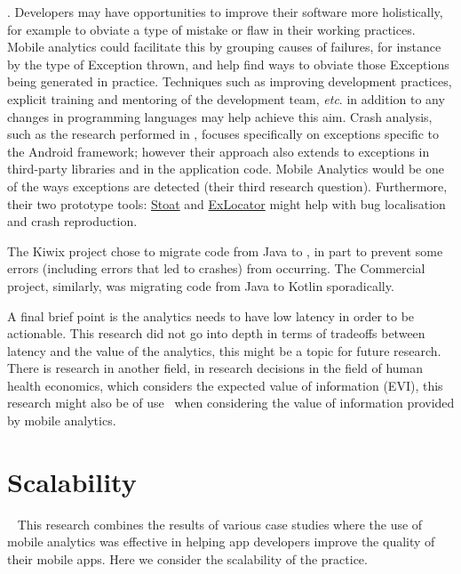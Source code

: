 . %
Developers may have opportunities to improve their software more holistically, for example to obviate a type of mistake or flaw in their working practices.  Mobile analytics could facilitate this by grouping causes of failures, for instance by the type of Exception thrown, and help find ways to obviate those Exceptions being generated in practice. Techniques such as improving development practices, explicit training and mentoring of the development team, \emph{etc}. in addition to any changes in programming languages may help achieve this aim. %
Crash analysis, such as the research performed in , focuses specifically on exceptions specific to the Android framework; however their approach also extends to exceptions in third-party libraries and in the application code. Mobile Analytics would be one of the ways exceptions are detected (their third research question). Furthermore, their two prototype tools: \href{https://github.com/tingsu/Stoat}{Stoat} and \href{https://github.com/crashanalysis/ExLocator}{ExLocator} might help with bug localisation and crash reproduction.

The Kiwix project chose to migrate code from Java to , in part to prevent some errors (including errors that led to crashes) from occurring. The Commercial project, similarly, was migrating code from Java to Kotlin sporadically.

A final brief point is the analytics needs to have low latency in order to be actionable. This research did not go into depth in terms of tradeoffs between latency and the value of the analytics, this might be a topic for future research.~ There is research in another field, in research decisions in the field of human health economics, which considers the expected value of information (EVI), this research might also be of use~ when considering the value of information provided by mobile analytics.


\section{Scalability}~\label{discussion-scalability}
This research combines the results of various case studies where the use of mobile analytics was effective in helping app developers improve the quality of their mobile apps. Here we consider the scalability of the practice. 

